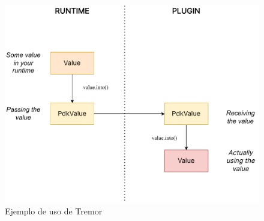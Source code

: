 \begin{figure}
    \centering
    \includegraphics[width=\textwidth]{./Imagenes/simplify.pdf}
    \caption{Ejemplo de uso de Tremor}%
    \label{fig:example_tremor}
\end{figure}
